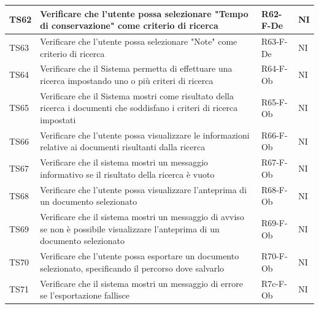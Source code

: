 \documentclass[a4paper,12pt]{article}
\begin{document}
\begin{longtable}{|M{1.2cm}|M{6.3cm}|M{2.5cm}|M{1.5cm}|}
                TS62 & Verificare che l'utente possa selezionare "Tempo di conservazione" come criterio di ricerca & R62-F-De & NI \\
                \hline
                                
                TS63 & Verificare che l'utente possa selezionare "Note" come criterio di ricerca & R63-F-De & NI \\
                \hline
                                
                TS64 & Verificare che il Sistema permetta di effettuare una ricerca impostando uno o più criteri di ricerca & R64-F-Ob & NI \\
                \hline
                                
                TS65 & Verificare che il Sistema mostri come risultato della ricerca i documenti che soddisfano i criteri di ricerca impostati& R65-F-Ob & NI \\
                \hline
                                
                TS66 & Verificare che l'utente possa visualizzare le informazioni relative ai documenti risultanti dalla ricerca & R66-F-Ob & NI \\
                \hline
                                
                TS67 & Verificare che il sistema mostri un messaggio informativo se il risultato della ricerca è vuoto & R67-F-Ob & NI \\
                \hline
                                
                TS68 & Verificare che l'utente possa visualizzare l'anteprima di un documento selezionato & R68-F-Ob & NI \\
                \hline
                                
                TS69 & Verificare che il sistema mostri un messaggio di avviso se non è possibile visualizzare l'anteprima di un documento selezionato & R69-F-Ob & NI \\
                \hline
                                
                TS70 & Verificare che l'utente possa esportare un documento selezionato, specificando il percorso dove salvarlo & R70-F-Ob & NI \\
                \hline
                                
                TS71 & Verificare che il sistema mostri un messaggio di errore se l'esportazione fallisce & R7c-F-Ob & NI \\
                \hline
                                

\end{longtable}
\end{document}
